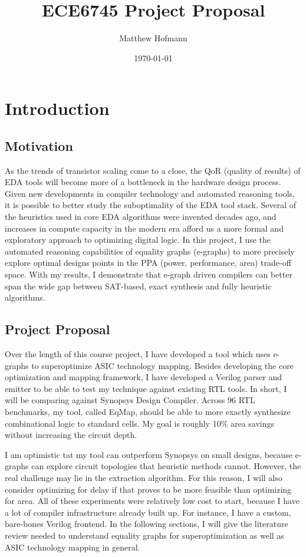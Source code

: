 \documentclass[10pt,letterpaper]{article}
\title{ECE6745 Project Proposal}
\author{Matthew Hofmann}
\date{\today}
\newcommand{\shortname}{EqMap}
\begin{document}
\maketitle


\section{Introduction}\label{sec:intro}
\subsection{Motivation}\label{sec:intro:motivation}

As the trends of transistor scaling come to a close, the QoR (quality of
results) of EDA tools will become more of a bottleneck in the hardware design
process. Given new developments in compiler technology and automated reasoning
tools, it is possible to better study the suboptimality of the EDA tool stack.
Several of the heuristics used in core EDA algorithms were invented decades
ago, and increases in compute capacity in the modern era afford us a more
formal and exploratory approach to optimizing digital logic. In this project, I
use the automated reasoning capabilities of equality graphs (e-graphs) to more
precisely explore optimal designs points in the PPA (power, performance, area)
trade-off space. With my results, I demonstrate that e-graph driven compilers
can better span the wide gap between SAT-based, exact synthesis and fully
heuristic algorithms.

\subsection{Project Proposal}\label{sec:intro:proposal}

Over the length of this course project, I have developed a tool which uses
e-graphs to superoptimize ASIC technology mapping. Besides developing the core
optimization and mapping framework, I have developed a Verilog parser and
emitter to be able to test my technique against existing RTL tools. In short, I
will be comparing against Synopsys Design Compiler. Across 96 RTL benchmarks,
my tool, called \shortname{}, should be able to more exactly synthesize
combinational logic to standard cells. My goal is roughly 10\% area savings
without increasing the circuit depth.

I am optimistic tat my tool can outperform Synopsys on small designs, because
e-graphs can explore circuit topologies that heuristic methods cannot. However,
the real challenge may lie in the extraction algorithm. For this reason, I will
also consider optimizing for delay if that proves to be more feasible than
optimizing for area. All of these experiments were relatively low cost to
start, because I have a lot of compiler infrastructure already built up. For
instance, I have a custom, bare-bones Verilog frontend. In the following
sections, I will give the literature review needed to understand equality
graphs for superoptimization as well as ASIC technology mapping in general.
\end{document}
